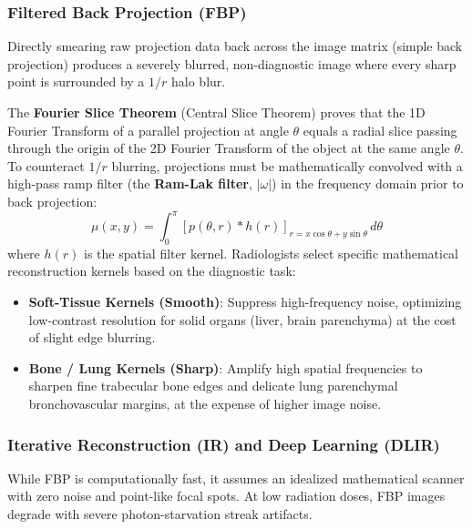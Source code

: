 \documentclass[11pt,a4paper]{article}
\begin{document}
\subsubsection{Filtered Back Projection (FBP)}
Directly smearing raw projection data back across the image matrix (simple back projection) produces a severely blurred, non-diagnostic image where every sharp point is surrounded by a $1/r$ halo blur.

The \textbf{Fourier Slice Theorem} (Central Slice Theorem) proves that the 1D Fourier Transform of a parallel projection at angle $\theta$ equals a radial slice passing through the origin of the 2D Fourier Transform of the object at the same angle $\theta$. To counteract $1/r$ blurring, projections must be mathematically convolved with a high-pass ramp filter (the \textbf{Ram-Lak filter}, $|\omega|$) in the frequency domain prior to back projection:
\begin{equation}
    \mu(x,y) = \int_0^\pi \left[ p(\theta, r) * h(r) \right]_{r = x\cos\theta + y\sin\theta} \, d\theta
\end{equation}
where $h(r)$ is the spatial filter kernel. Radiologists select specific mathematical reconstruction kernels based on the diagnostic task:
\begin{itemize}
    \item \textbf{Soft-Tissue Kernels (Smooth)}: Suppress high-frequency noise, optimizing low-contrast resolution for solid organs (liver, brain parenchyma) at the cost of slight edge blurring.
    \item \textbf{Bone / Lung Kernels (Sharp)}: Amplify high spatial frequencies to sharpen fine trabecular bone edges and delicate lung parenchymal bronchovascular margins, at the expense of higher image noise.
\end{itemize}

\subsubsection{Iterative Reconstruction (IR) and Deep Learning (DLIR)}
While FBP is computationally fast, it assumes an idealized mathematical scanner with zero noise and point-like focal spots. At low radiation doses, FBP images degrade with severe photon-starvation streak artifacts.
\end{document}
